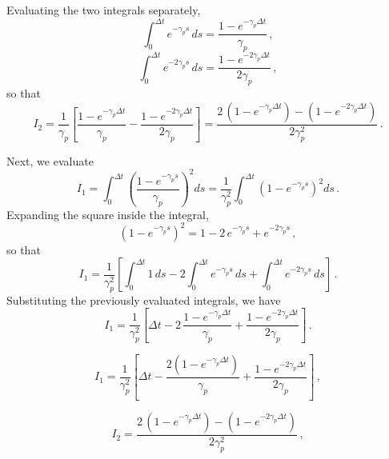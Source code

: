 \documentclass[]{scrartcl}
\begin{document}
	Evaluating the two integrals separately,
	\begin{equation}
	\int_0^{\Delta t} e^{-\gamma_p s}\, ds 
	= \frac{1 - e^{-\gamma_p \Delta t}}{\gamma_p}\,,
	\end{equation}
	\begin{equation}
	\int_0^{\Delta t} e^{-2\gamma_p s}\, ds 
	= \frac{1 - e^{-2\gamma_p \Delta t}}{2\gamma_p}\,,
	\end{equation}
	so that
	\begin{equation}
	I_2 = \frac{1}{\gamma_p} \left[\frac{1 - e^{-\gamma_p \Delta t}}{\gamma_p} - \frac{1 - e^{-2\gamma_p \Delta t}}{2\gamma_p}\right]
	= \frac{2\,(1 - e^{-\gamma_p \Delta t}) - (1 - e^{-2\gamma_p \Delta t})}{2\gamma_p^2}\,.
	\end{equation}
	
	Next, we evaluate
	\begin{equation}
	I_1 = \int_0^{\Delta t} \left(\frac{1 - e^{-\gamma_p s}}{\gamma_p}\right)^2 ds 
	= \frac{1}{\gamma_p^2} \int_0^{\Delta t} \left(1 - e^{-\gamma_p s}\right)^2 ds\,.
	\end{equation}
	Expanding the square inside the integral,
	\begin{equation}
	\left(1 - e^{-\gamma_p s}\right)^2 = 1 - 2\,e^{-\gamma_p s} + e^{-2\gamma_p s}\,,
	\end{equation}
	so that
	\begin{equation}
	I_1 = \frac{1}{\gamma_p^2} \left[\int_0^{\Delta t} 1\,ds - 2\int_0^{\Delta t} e^{-\gamma_p s}\,ds + \int_0^{\Delta t} e^{-2\gamma_p s}\,ds \right]\,.
	\end{equation}
	Substituting the previously evaluated integrals, we have
	\begin{equation}
	I_1 = \frac{1}{\gamma_p^2} \left[ \Delta t - 2\,\frac{1 - e^{-\gamma_p \Delta t}}{\gamma_p} + \frac{1 - e^{-2\gamma_p \Delta t}}{2\gamma_p} \right]\,.
	\end{equation}
	
	
	\begin{equation}
	\boxed{
	I_1 = \frac{1}{\gamma_p^2} \left[ \Delta t - \frac{2(1 - e^{-\gamma_p \Delta t})}{\gamma_p} + \frac{1 - e^{-2\gamma_p \Delta t}}{2\gamma_p} \right]\,,
	}
	\end{equation}
	
	\begin{equation}
	\boxed{
	I_2 = \frac{2\,(1 - e^{-\gamma_p \Delta t}) - (1 - e^{-2\gamma_p \Delta t})}{2\gamma_p^2}\,,
	}
	\end{equation}
	
\end{document}
